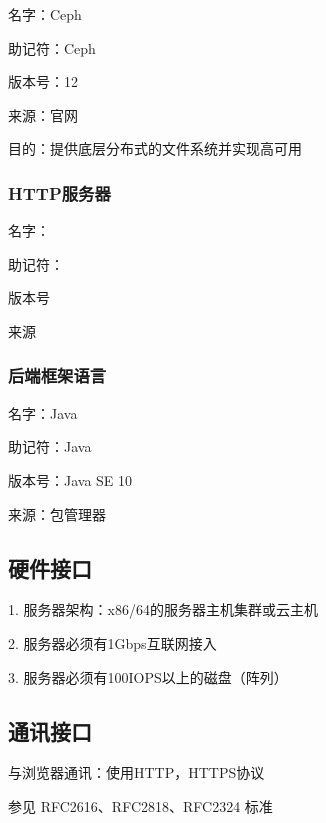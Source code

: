 名字：Ceph

助记符：Ceph

版本号：12

来源：官网

目的：提供底层分布式的文件系统并实现高可用

\subsubsection{HTTP服务器}

名字：

助记符：

版本号

来源

\subsubsection{后端框架语言}

名字：Java

助记符：Java

版本号：Java SE 10

来源：包管理器 

\subsection{硬件接口}

1. 服务器架构：x86/64的服务器主机集群或云主机

2. 服务器必须有1Gbps互联网接入

3. 服务器必须有100IOPS以上的磁盘（阵列）

\subsection{通讯接口}

与浏览器通讯：使用HTTP，HTTPS协议

参见 RFC2616、RFC2818、RFC2324 标准


